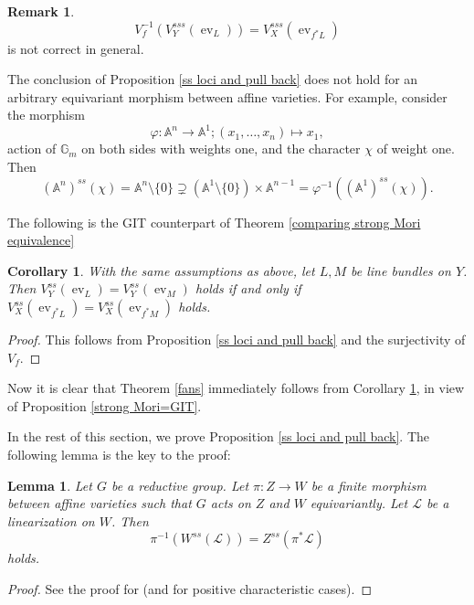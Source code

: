\documentclass[12pt,twoside]{amsart}
\newtheorem{lem}[theo]{Lemma}
\newtheorem{cor}[theo]{Corollary}
\theoremstyle{definition}
\newtheorem{rem}[theo]{Remark}
\newcommand\ev{\mathop{\mathrm{ev}}\nolimits}
\begin{document}
\begin{rem}
\begin{equation*}
V_f^{-1}(V_Y^{sss}(\ev_L))=V_X^{sss}(\ev_{f^{*}L})
\end{equation*}
is not correct in general.

The conclusion of Proposition \ref{ss loci and pull back} does not hold for an arbitrary equivariant morphism
between affine varieties. For example, consider the morphism
\begin{equation*}
\varphi:\mathbb{A}^{n}\to\mathbb{A}^{1};(x_1,\dots,x_n)\mapsto x_1,
\end{equation*}
action of $\mathbb{G}_m$ on both sides with weights one, and the character $\chi$ of weight one.
Then
\begin{equation*}
(\mathbb{A}^{n})^{ss}(\chi)=\mathbb{A}^{n}\setminus\{0\}\supsetneq(\mathbb{A}^{1}\setminus\{0\})\times\mathbb{A}^{n-1}
=\varphi^{-1}((\mathbb{A}^{1})^{ss}(\chi)).
\end{equation*}
\end{rem}

The following is the GIT counterpart of Theorem \ref{comparing strong Mori equivalence}
\begin{cor}\label{comparing GIT equivalence}
With the same assumptions as above, let $L,M$ be line bundles on $Y$. Then
$V_Y^{ss}(\ev_L)=V_Y^{ss}(\ev_M)$ holds if and only if
$V_X^{ss}(\ev_{f^*L})=V_X^{ss}(\ev_{f^*M})$ holds.
\end{cor}
\begin{proof}
This follows from Proposition \ref{ss loci and pull back} and the surjectivity of $V_f$.
\end{proof}

Now it is clear that Theorem \ref{fans} immediately follows from
Corollary \ref{comparing GIT equivalence}, in view of Proposition \ref{strong Mori=GIT}.

In the rest of this section, we prove Proposition \ref{ss loci and pull back}.
The following lemma is the key to the proof:
\begin{lem}\label{stable loci under finite morphism}
Let $G$ be a reductive group. Let $\pi:Z\to W$ be a finite morphism between affine varieties such that
$G$ acts on $Z$ and $W$ equivariantly. Let $\mathcal{L}$ be a linearization on $W$. Then
\begin{equation*}
\pi^{-1}(W^{ss}(\mathcal{L}))=Z^{ss}(\pi^{*}\mathcal{L})
\end{equation*}
holds.
\end{lem}
\begin{proof}
See the proof for \cite[Theorem 1.19]{git} (and \cite[Appendix to Chapter 1, \S C]{git} for
positive characteristic cases).
\end{proof}
\end{document}
